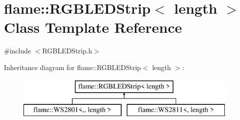 \hypertarget{classflame_1_1_r_g_b_l_e_d_strip}{\section{flame\-:\-:R\-G\-B\-L\-E\-D\-Strip$<$ length $>$ Class Template Reference}
\label{classflame_1_1_r_g_b_l_e_d_strip}
}


{\ttfamily \#include $<$R\-G\-B\-L\-E\-D\-Strip.\-h$>$}

Inheritance diagram for flame\-:\-:R\-G\-B\-L\-E\-D\-Strip$<$ length $>$\-:\begin{figure}[H]
\begin{center}
\leavevmode
\includegraphics[height=2.000000cm]{classflame_1_1_r_g_b_l_e_d_strip}
\end{center}
\end{figure}
